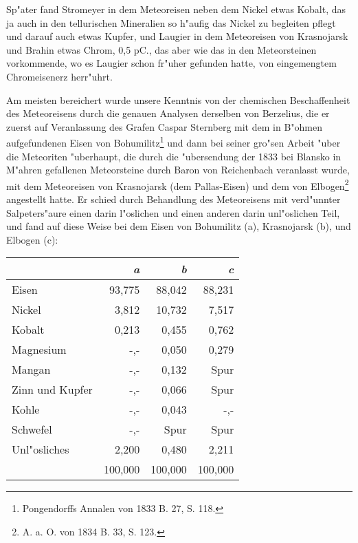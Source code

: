 \documentclass[a4paper, 11pt, oneside]{article}
\begin{document}
Sp"ater fand Stromeyer in dem Meteoreisen neben dem Nickel etwas Kobalt, das ja auch in den tellurischen Mineralien so h"aufig das Nickel zu begleiten pflegt und darauf auch etwas Kupfer, und Laugier in dem Meteoreisen von Krasnojarsk und Brahin etwas Chrom, 0,5 pC., das aber wie das in den Meteorsteinen vorkommende, wo es Laugier schon fr"uher gefunden hatte, von eingemengtem Chromeisenerz herr"uhrt.

Am meisten bereichert wurde unsere Kenntnis von der chemischen Beschaffenheit des Meteoreisens durch die genauen Analysen derselben von Berzelius, die er zuerst auf Veranlassung des Grafen Caspar Sternberg mit dem in B"ohmen aufgefundenen Eisen von Bohumilitz\footnote{Pongendorffs Annalen von 1833 B. 27, S. 118.} und dann bei seiner gro"sen Arbeit "uber die Meteoriten "uberhaupt, die durch die "ubersendung der 1833 bei Blansko in M"ahren gefallenen Meteorsteine durch Baron von Reichenbach veranlasst wurde, mit dem Meteoreisen von Krasnojarsk (dem Pallas-Eisen) und dem von Elbogen\footnote{A. a. O. von 1834 B. 33, S. 123.} angestellt hatte. Er schied durch Behandlung des Meteoreisens mit verd"unnter Salpeters"aure einen darin l"oslichen und einen anderen darin unl"oslichen Teil, und fand auf diese Weise bei dem Eisen von Bohumilitz (a), Krasnojarsk (b), und Elbogen (c):
\begin{center}
\begin{tabular}{ |l|r|r|r| }
    \hline
     & \emph{a} & \emph{b} & \emph{c}\\
    \hline\hline
    Eisen & 93,775 & 88,042 & 88,231\\\hline
    Nickel & 3,812 & 10,732 & 7,517\\\hline
    Kobalt & 0,213 & 0,455 & 0,762\\\hline
    Magnesium & -,- & 0,050 & 0,279\\\hline
    Mangan & -,- & 0,132 & Spur\\\hline
    Zinn und Kupfer & -,- & 0,066 & Spur\\\hline
    Kohle & -,- & 0,043 & -,-\\\hline
    Schwefel & -,- & Spur & Spur\\\hline
    Unl"osliches & 2,200 & 0,480 & 2,211\\\hline
    & 100,000 & 100,000 & 100,000\\
    \hline
\end{tabular}
\end{center}
\end{document}

